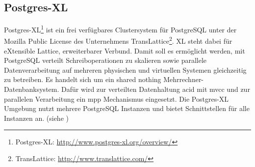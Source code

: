 \subsection{Postgres-XL}
\label{grundlagen:postgresxl}
Postgres-XL\footnote{Postgres-XL: \url{http://www.postgres-xl.org/overview/}} ist ein frei verfügbares Clustersystem für PostgreSQL unter der Mozilla Public License des Unternehmens TransLattice\footnote{TransLattice: \url{http://www.translattice.com/}}.
XL steht dabei für eXtensible Lattice, erweiterbarer Verbund.
Damit soll es ermöglicht werden, mit PostgreSQL verteilt Schreiboperationen zu skalieren sowie parallele Datenverarbeitung auf mehreren physischen und virtuellen Systemen gleichzeitig zu betreiben.
Es handelt sich um ein shared nothing Mehrrechner-Datenbanksystem.
Dafür wird zur verteilten Datenhaltung \Gls{acid} mit \Gls{mvcc} und zur parallelen Verarbeitung ein \Gls{mpp} Mechanismus eingesetzt.
Die Postgres-XL Umgebung nutzt mehrere PostgreSQL Instanzen und bietet Schnittstellen für alle Instanzen an. (siehe \cite{website:postgresxl-about})

